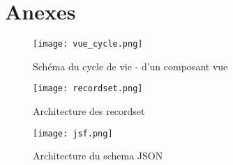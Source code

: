\section{Anexes}

  
\begin{figure}[htbp]
    \center
    \texttt{[image: vue\_cycle.png]}
    \label{fig:vue_cycle}
    \caption{Schéma du cycle de vie - d'un composant vue\cite{vuelifecycle}}
\end{figure}
    
\begin{figure}[htbp]
    \center 
    \texttt{[image: recordset.png]}
    \label{fig:recordset}
    \caption{Architecture des recordset}
\end{figure}
\begin{figure}
    \center 
    \texttt{[image: jsf.png]}
    \label{fig:jsf}
    \caption{Architecture du schema JSON}
\end{figure}